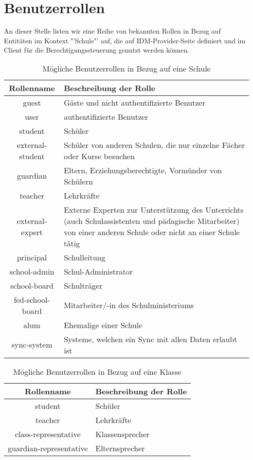 \section{Benutzerrollen}
\label{Benutzerrollen}
An dieser Stelle listen wir eine Reihe von bekannten Rollen in Bezug auf Entitäten im Kontext "'Schule"' auf, die auf IDM-Provider-Seite definiert und im Client für die Berechtigungssteuerung genutzt werden können.
\\


\begin{table}[htb]
	\begin{tabularx}{\textwidth}{|c|X|}
		\hline
\textbf{Rollenname} & \textbf{Beschreibung der Rolle} \\ \hline
guest & Gäste und nicht authentifizierte Benutzer \\ \hline
user & authentifizierte Benutzer \\ \hline
student & Schüler \\ \hline
external-student & Schüler von anderen Schulen, die nur einzelne Fächer oder Kurse besuchen \\ \hline
guardian & Eltern, Erziehungsberechtigte, Vormünder von Schülern \\ \hline
teacher & Lehrkräfte \\ \hline
external-expert & Externe Experten zur Unterstützung des Unterrichts (auch Schulassistenten und pädagische Mitarbeiter) von einer anderen Schule oder nicht an einer Schule tätig \\ \hline
principal & Schulleitung \\ \hline
school-admin & Schul-Administrator \\ \hline
school-board & Schulträger \\ \hline
fed-school-board & Mitarbeiter/-in des Schulministeriums \\ \hline
alum & Ehemalige einer Schule \\ \hline
sync-system & Systeme, welchen ein Sync mit allen Daten erlaubt ist \\ \hline

	\end{tabularx}

		\caption{Mögliche Benutzerrollen in Bezug auf eine Schule}
		\label{tab:intro:rolesschool}
\end{table}

\begin{table}[htb]
	\begin{tabularx}{\textwidth}{|c|X|}
		\hline
\textbf{Rollenname} & \textbf{Beschreibung der Rolle} \\ \hline
student & Schüler \\ \hline
teacher & Lehrkräfte \\ \hline
class-representative & Klassensprecher \\ \hline
guardian-representative & Elternsprecher \\ \hline

	\end{tabularx}

		\caption{Mögliche Benutzerrollen in Bezug auf eine Klasse}
		\label{tab:intro:rolesclass}
\end{table}

